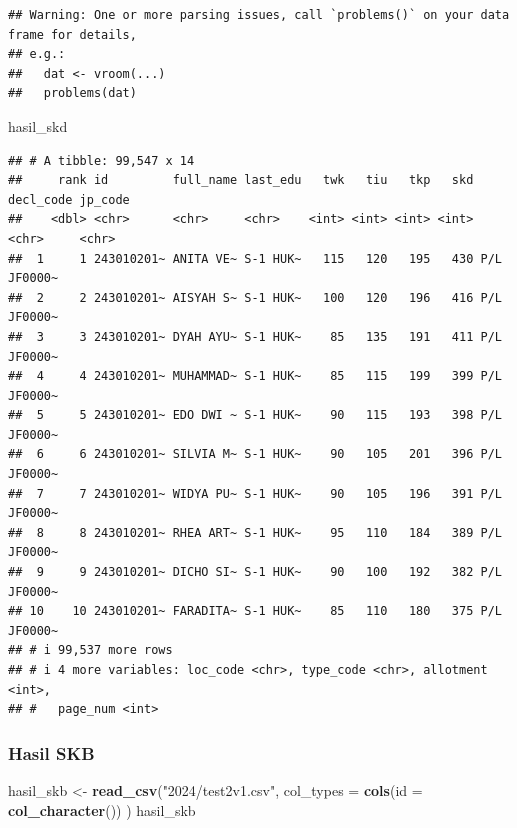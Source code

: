 \documentclass[
]{article}
\newenvironment{Shaded}{\begin{snugshade}}{\end{snugshade}}
\newcommand{\AttributeTok}[1]{\textcolor[rgb]{0.13,0.29,0.53}{#1}}
\newcommand{\FunctionTok}[1]{\textcolor[rgb]{0.13,0.29,0.53}{\textbf{#1}}}
\newcommand{\NormalTok}[1]{#1}
\newcommand{\OtherTok}[1]{\textcolor[rgb]{0.56,0.35,0.01}{#1}}
\newcommand{\StringTok}[1]{\textcolor[rgb]{0.31,0.60,0.02}{#1}}
\begin{document}
\begin{verbatim}
## Warning: One or more parsing issues, call `problems()` on your data frame for details,
## e.g.:
##   dat <- vroom(...)
##   problems(dat)
\end{verbatim}

\begin{Shaded}
\begin{Highlighting}[]
\NormalTok{hasil\_skd}
\end{Highlighting}
\end{Shaded}

\begin{verbatim}
## # A tibble: 99,547 x 14
##     rank id         full_name last_edu   twk   tiu   tkp   skd decl_code jp_code
##    <dbl> <chr>      <chr>     <chr>    <int> <int> <int> <int> <chr>     <chr>  
##  1     1 243010201~ ANITA VE~ S-1 HUK~   115   120   195   430 P/L       JF0000~
##  2     2 243010201~ AISYAH S~ S-1 HUK~   100   120   196   416 P/L       JF0000~
##  3     3 243010201~ DYAH AYU~ S-1 HUK~    85   135   191   411 P/L       JF0000~
##  4     4 243010201~ MUHAMMAD~ S-1 HUK~    85   115   199   399 P/L       JF0000~
##  5     5 243010201~ EDO DWI ~ S-1 HUK~    90   115   193   398 P/L       JF0000~
##  6     6 243010201~ SILVIA M~ S-1 HUK~    90   105   201   396 P/L       JF0000~
##  7     7 243010201~ WIDYA PU~ S-1 HUK~    90   105   196   391 P/L       JF0000~
##  8     8 243010201~ RHEA ART~ S-1 HUK~    95   110   184   389 P/L       JF0000~
##  9     9 243010201~ DICHO SI~ S-1 HUK~    90   100   192   382 P/L       JF0000~
## 10    10 243010201~ FARADITA~ S-1 HUK~    85   110   180   375 P/L       JF0000~
## # i 99,537 more rows
## # i 4 more variables: loc_code <chr>, type_code <chr>, allotment <int>,
## #   page_num <int>
\end{verbatim}

\subsubsection{Hasil SKB}\label{hasil-skb}

\begin{Shaded}
\begin{Highlighting}[]
\NormalTok{hasil\_skb }\OtherTok{\textless{}{-}} \FunctionTok{read\_csv}\NormalTok{(}\StringTok{"2024/test2v1.csv"}\NormalTok{, }
                      \AttributeTok{col\_types =} \FunctionTok{cols}\NormalTok{(}\AttributeTok{id =} \FunctionTok{col\_character}\NormalTok{())}
\NormalTok{                      )}
\NormalTok{hasil\_skb}
\end{Highlighting}
\end{Shaded}
\end{document}
